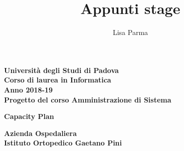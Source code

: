 \documentclass[a4paper, oneside, openany,12pt]{article}
\title{\textbf{Appunti stage}}
\author{Lisa Parma}
\begin{document}
	
\begin{titlepage}
	\begin{center}
	
		\textbf{Università degli Studi di Padova \\ Corso di laurea in Informatica \\ Anno 2018-19 \\}
		\textbf{Progetto del corso Amministrazione di Sistema}
		\vspace{1cm}
		\begin{center}
			\begin{Huge}
				\textbf{Capacity Plan} \\
			\end{Huge}
			\begin{Large}
				\textbf{Azienda Ospedaliera} \\
				\textbf{Istituto Ortopedico Gaetano Pini} \\
			\end{Large}
		
	\end{center}
	\end{center}
\end{titlepage}

\tableofcontents

\end{document}
